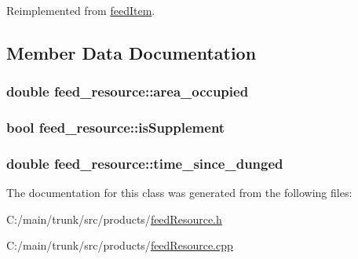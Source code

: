 Reimplemented from \hyperlink{classfeed_item_ab4c308e0864a941e9652ae997df1142c}{feedItem}.

\subsection{Member Data Documentation}
\hypertarget{classfeed__resource_a0cd3064360d82f46a86fd6ef695838d6}{
\subsubsection[{area\_\-occupied}]{\setlength{\rightskip}{0pt plus 5cm}double {\bf feed\_\-resource::area\_\-occupied}}}
\label{classfeed__resource_a0cd3064360d82f46a86fd6ef695838d6}
\hypertarget{classfeed__resource_a5ededcdd1769b409b7d30c86c1a09cd1}{
\subsubsection[{isSupplement}]{\setlength{\rightskip}{0pt plus 5cm}bool {\bf feed\_\-resource::isSupplement}}}
\label{classfeed__resource_a5ededcdd1769b409b7d30c86c1a09cd1}
\hypertarget{classfeed__resource_af20b1c8f5518da8da058da89f8e7d9f5}{
\subsubsection[{time\_\-since\_\-dunged}]{\setlength{\rightskip}{0pt plus 5cm}double {\bf feed\_\-resource::time\_\-since\_\-dunged}}}
\label{classfeed__resource_af20b1c8f5518da8da058da89f8e7d9f5}


The documentation for this class was generated from the following files:\begin{DoxyCompactItemize}
\item 
C:/main/trunk/src/products/\hyperlink{feed_resource_8h}{feedResource.h}\item 
C:/main/trunk/src/products/\hyperlink{feed_resource_8cpp}{feedResource.cpp}\end{DoxyCompactItemize}
